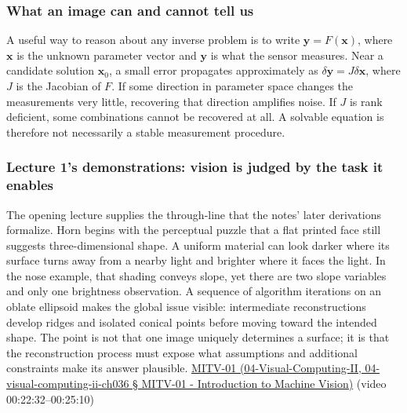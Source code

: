 \subsubsection{What an image can and cannot tell us}\label{what-an-image-can-and-cannot-tell-us}

A useful way to reason about any inverse problem is to write \(\mathbf{y}=F(\mathbf{x})\), where \(\mathbf{x}\) is the unknown parameter vector and \(\mathbf{y}\) is what the sensor measures. Near a candidate solution \(\mathbf{x}_0\), a small error propagates approximately as \(\delta\mathbf{y}=J\delta\mathbf{x}\), where \(J\) is the Jacobian of \(F\). If some direction in parameter space changes the measurements very little, recovering that direction amplifies noise. If \(J\) is rank deficient, some combinations cannot be recovered at all. A solvable equation is therefore not necessarily a stable measurement procedure.

\subsubsection{Lecture 1's demonstrations: vision is judged by the task it enables}\label{lecture-1s-demonstrations-vision-is-judged-by-the-task-it-enables}

The opening lecture supplies the through-line that the notes' later derivations formalize. Horn begins with the perceptual puzzle that a flat printed face still suggests three-dimensional shape. A uniform material can look darker where its surface turns away from a nearby light and brighter where it faces the light. In the nose example, that shading conveys slope, yet there are two slope variables and only one brightness observation. A sequence of algorithm iterations on an oblate ellipsoid makes the global issue visible: intermediate reconstructions develop ridges and isolated conical points before moving toward the intended shape. The point is not that one image uniquely determines a surface; it is that the reconstruction process must expose what assumptions and additional constraints make its answer plausible. \href{}{MITV-01 (04-Visual-Computing-II, 04-visual-computing-ii-ch036 § MITV-01 - Introduction to Machine Vision)} (video 00:22:32--00:25:10)

